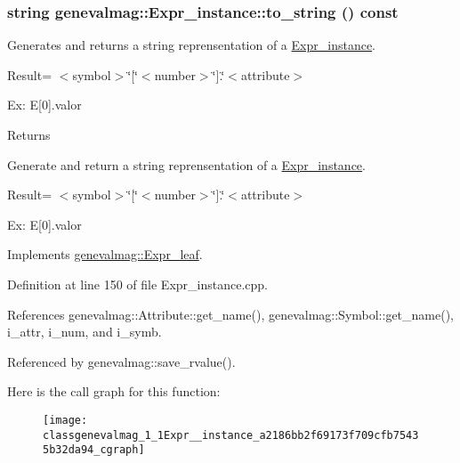 \hypertarget{classgenevalmag_1_1Expr__instance_a2186bb2f69173f709cfb75435b32da94}{
\subsubsection[{to\_\-string}]{\setlength{\rightskip}{0pt plus 5cm}string genevalmag::Expr\_\-instance::to\_\-string () const}}
\label{classgenevalmag_1_1Expr__instance_a2186bb2f69173f709cfb75435b32da94}
Generates and returns a string reprensentation of a \hyperlink{classgenevalmag_1_1Expr__instance}{Expr\_\-instance}.\par
 \par
 Result= $<$symbol$>$\char`\"{}\mbox{[}\char`\"{}$<$number$>$\char`\"{}\mbox{]}.\char`\"{}$<$attribute$>$\par
 \par
 Ex: E\mbox{[}0\mbox{]}.valor\par
 \begin{DoxyReturn}{Returns}

\end{DoxyReturn}
Generate and return a string reprensentation of a \hyperlink{classgenevalmag_1_1Expr__instance}{Expr\_\-instance}.

Result= $<$symbol$>$\char`\"{}\mbox{[}\char`\"{}$<$number$>$\char`\"{}\mbox{]}.\char`\"{}$<$attribute$>$

Ex: E\mbox{[}0\mbox{]}.valor 

Implements \hyperlink{classgenevalmag_1_1Expr__leaf_a96854f59a155b173b6e79007d87bdad5}{genevalmag::Expr\_\-leaf}.



Definition at line 150 of file Expr\_\-instance.cpp.



References genevalmag::Attribute::get\_\-name(), genevalmag::Symbol::get\_\-name(), i\_\-attr, i\_\-num, and i\_\-symb.



Referenced by genevalmag::save\_\-rvalue().



Here is the call graph for this function:\nopagebreak
\begin{figure}[H]
\begin{center}
\leavevmode
\texttt{[image: classgenevalmag\_1\_1Expr\_\_instance\_a2186bb2f69173f709cfb75435b32da94\_cgraph]}
\end{center}
\end{figure}




